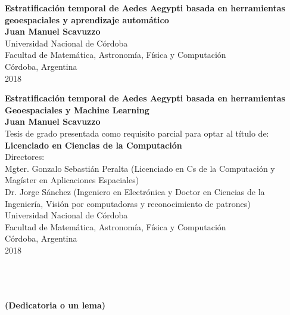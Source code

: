 \begin{center}
\begin{figure}
\centering%
%
\end{figure}
\thispagestyle{empty} \vspace*{0.1cm} \textbf{\huge
Estratificación temporal de Aedes Aegypti basada en herramientas geoespaciales y aprendizaje automático}\\[9.0cm]
\Large\textbf{Juan Manuel Scavuzzo}\\[0.5cm]
\small Universidad Nacional de Córdoba\\
Facultad de Matemática, Astronomía, Física y Computación\\
Córdoba, Argentina\\
2018\\
\end{center}

\newpage{\pagestyle{empty}\cleardoublepage}

\newpage
\begin{center}
\thispagestyle{empty} \vspace*{0cm} \textbf{\huge
Estratificación temporal de Aedes Aegypti basada en herramientas Geoespaciales y Machine Learning}\\[3.0cm]
\Large\textbf{Juan Manuel Scavuzzo}\\[2.0cm]
\small Tesis de grado presentada como requisito parcial para optar al
título de:\\
\textbf{Licenciado en Ciencias de la Computación}\\[2.5cm]
Directores:\\

Mgter. Gonzalo Sebastián Peralta (Licenciado en Cs de la Computación y Magíster en Aplicaciones Espaciales)\\
Dr. Jorge Sánchez (Ingeniero en Electrónica y Doctor en Ciencias de la Ingeniería, Visión por computadoras y reconocimiento de patrones)\\ [3.0cm]

Universidad Nacional de Córdoba\\
Facultad de Matemática, Astronomía, Física y Computación\\
Córdoba, Argentina\\
2018\\\end{center}

\newpage{\pagestyle{empty}\cleardoublepage}

\newpage
\thispagestyle{empty} \textbf{}\normalsize
\\\\\\%
\textbf{(Dedicatoria o un lema)}\\[4.0cm]

